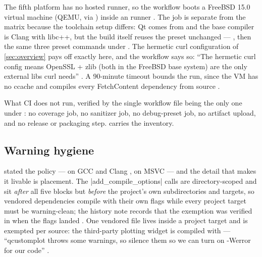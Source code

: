 The fifth platform has no hosted runner, so the workflow boots a FreeBSD 15.0 virtual
machine (QEMU, via ) inside an  runner
. The job is separate from the
matrix because the toolchain setup differs: Qt comes from  and the base
compiler is Clang with libc++, but the build itself reuses the 
preset unchanged --- , then
the same three preset commands under 
. The hermetic curl configuration
of \cref{sec:overview} pays off exactly here, and the workflow says so: ``The hermetic
curl config means OpenSSL + zlib (both in the FreeBSD base system) are the only external
libs curl needs'' . A 90-minute
timeout bounds the run, since the VM has no ccache and compiles every FetchContent
dependency from source .

What CI does not run, verified by the single workflow file being the only one under
: no coverage job, no sanitizer job, no debug-preset job, no
artifact upload, and no release or packaging step.  carries the
inventory.

\subsection{Warning hygiene}\label{sec:testing-warnings}

 stated the policy ---  on GCC
and Clang ,  on MSVC  ---
and the detail that makes it livable is placement. The
\cppinline|add_compile_options| calls are directory-scoped and sit \emph{after} all five
 blocks but \emph{before} the project's own
subdirectories and targets, so vendored dependencies compile with their own flags while
every project target must be warning-clean; the history note records that the exemption
was verified in  when the flags landed .
One vendored file lives inside a project target and is exempted per source: the
third-party plotting widget  is compiled with  ---
``qcustomplot throws some warnings, so silence them so we can turn on -Werror for our
code'' .

